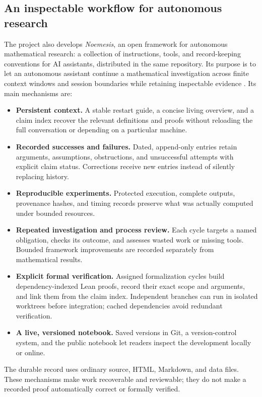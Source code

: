 \subsection{An inspectable workflow for autonomous research}
The project also develops \emph{Noemesis}, an open framework for autonomous
mathematical research: a collection of instructions, tools, and record-keeping conventions
for AI assistants, distributed in the same repository.
Its purpose is to let an autonomous assistant continue a mathematical
investigation across finite context windows and session boundaries
while retaining inspectable evidence \cite{Repo}.
Its main mechanisms are:
\begin{itemize}
 \item \textbf{Persistent context.}
 A stable restart guide, a concise living overview, and a claim index
 recover the relevant definitions and proofs without reloading the
 full conversation or depending on a particular machine.
 \item \textbf{Recorded successes and failures.}
 Dated, append-only entries retain arguments, assumptions,
 obstructions, and unsuccessful attempts with explicit claim status.
 Corrections receive new entries instead of silently replacing history.
 \item \textbf{Reproducible experiments.}
 Protected execution, complete outputs, provenance hashes, and
 timing records preserve what was actually computed under bounded
 resources.
 \item \textbf{Repeated investigation and process review.}
 Each cycle targets a named obligation, checks its outcome, and
 assesses wasted work or missing tools. Bounded framework
 improvements are recorded separately from mathematical results.
 \item \textbf{Explicit formal verification.}
 Assigned formalization cycles build dependency-indexed Lean proofs, record
 their exact scope and arguments, and link them from the
 claim index. Independent branches can run in isolated worktrees before
 integration; cached dependencies avoid redundant verification.
 \item \textbf{A live, versioned notebook.}
 Saved versions in Git, a version-control system, and the public notebook let
 readers inspect the development locally or online.
\end{itemize}
The durable record uses ordinary source, HTML, Markdown, and data files.
These mechanisms make work recoverable and reviewable; they do not
make a recorded proof automatically correct or formally verified.

